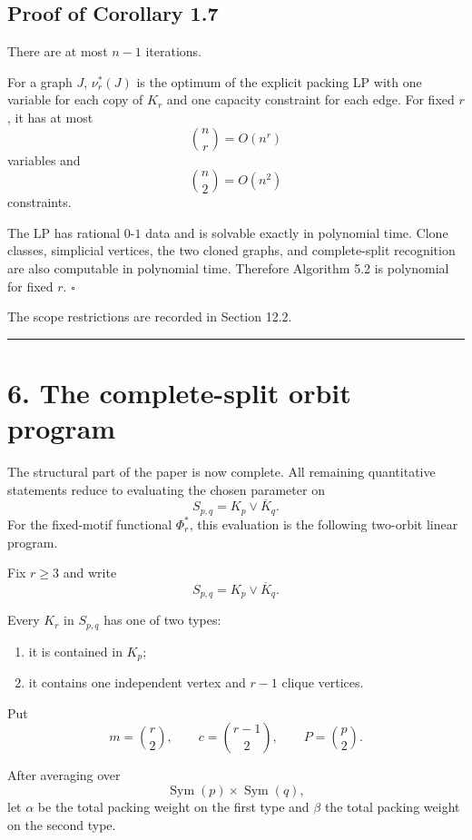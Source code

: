 \documentclass[11pt,a4paper]{article}
\providecommand{\tightlist}{\setlength{\itemsep}{0pt}\setlength{\parskip}{0pt}}
\begin{document}
\subsection{Proof of Corollary 1.7}\label{proof-of-corollary-1.7}

There are at most \(n-1\) iterations.

For a graph \(J\), \(\nu_r^*(J)\) is the optimum of the explicit packing LP
with one variable for each copy of \(K_r\) and one capacity constraint for
each edge. For fixed \(r\), it has at most
\[
\binom nr=O(n^r)
\]
variables and
\[
\binom n2=O(n^2)
\]
constraints.

The LP has rational \(0\)-\(1\) data and is solvable exactly in polynomial
time. Clone classes, simplicial vertices, the two cloned graphs, and
complete-split recognition are also computable in polynomial time.
Therefore Algorithm 5.2 is polynomial for fixed \(r\).
\(\square\)

The scope restrictions are recorded in Section 12.2.

\begin{center}\rule{0.5\linewidth}{0.5pt}\end{center}

\section{6. The complete-split orbit program}\label{the-complete-split-orbit-program}

The structural part of the paper is now complete. All remaining
quantitative statements reduce to evaluating the chosen parameter on
\[
S_{p,q}=K_p\vee\overline K_q.
\]
For the fixed-motif functional \(\Phi_r^*\), this evaluation is the following
two-orbit linear program.

Fix \(r\ge3\) and write
\[
S_{p,q}=K_p\vee\overline K_q.
\]

Every \(K_r\) in \(S_{p,q}\) has one of two types:

\begin{enumerate}
\def\labelenumi{\arabic{enumi}.}
\tightlist
\item
  it is contained in \(K_p\);
\item
  it contains one independent vertex and \(r-1\) clique vertices.
\end{enumerate}

Put
\[
m=\binom r2,
\qquad
c=\binom{r-1}{2},
\qquad
P=\binom p2.
\tag{6.1}
\]

After averaging over
\[
\operatorname{Sym}(p)\times\operatorname{Sym}(q),
\]
let \(\alpha\) be the total packing weight on the first type and \(\beta\)
the total packing weight on the second type.
\end{document}
